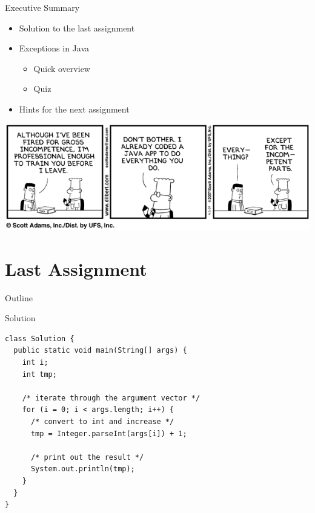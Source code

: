 \begin{frame}{Executive Summary}
  \begin{itemize}
  \item Solution to the last assignment
  \item Exceptions in Java
    \begin{itemize}
    \item Quick overview
    \item Quiz
    \end{itemize}
  \item Hints for the next assignment
  \end{itemize}


  \begin{center}
    \includegraphics[scale=0.45]{figures/dilbert-1}
  \end{center}
\end{frame}


\section{Last Assignment}

\begin{frame}{Outline}
  \tableofcontents[current]
\end{frame}

\begin{frame}[fragile]{Solution}
  \begin{lstlisting}
class Solution {
  public static void main(String[] args) {
    int i;
    int tmp;
    
    /* iterate through the argument vector */
    for (i = 0; i < args.length; i++) {
      /* convert to int and increase */
      tmp = Integer.parseInt(args[i]) + 1;
      
      /* print out the result */
      System.out.println(tmp); 
    }
  }	
}
  \end{lstlisting}
\end{frame}

